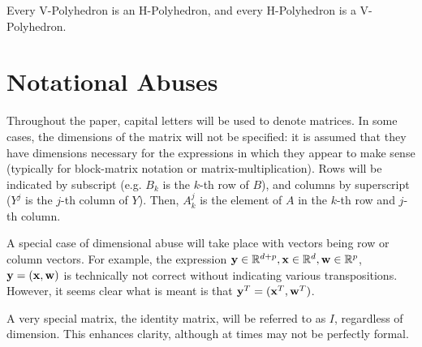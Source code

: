 \begin{Thm}[{\MWT}]
		Every V-Polyhedron is an H-Poly\-hedron, and every H-Polyhedron is a V-Polyhedron.
\end{Thm}

\section{Notational Abuses}

Throughout the paper, capital letters will be used to denote matrices.  In some cases, the dimensions of the matrix will not be specified: it is assumed that they have dimensions necessary for the expressions in which they appear to make sense (typically for block-matrix notation or matrix-multiplication).  Rows will be indicated by subscript (e.g. $B_k$ is the $k$-th row of $B$), and columns by superscript ($Y^j$ is the $j$-th column of $Y$).  Then, $A_k^j$ is the element of $A$ in the $k$-th row and $j$-th column.

A special case of dimensional abuse will take place with vectors being row or column vectors.  For example, the expression $\mathbf{y}\in\mathbb{R}^{d+p}, \mathbf{x}\in\mathbb{R}^d, \mathbf{w}\in\mathbb{R}^p$, $\mathbf{y} = (\mathbf{x},\mathbf{w})$ is technically not correct without indicating various transpositions.  However, it seems clear what is meant is that $\mathbf{y}^T = (\mathbf{x}^T,\mathbf{w}^T)$.

A very special matrix, the identity matrix, will be referred to as $I$, regardless of dimension.  This enhances clarity, although at times may not be perfectly formal.
